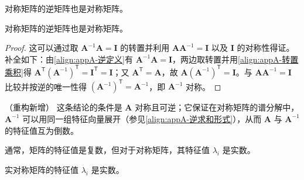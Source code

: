 \documentclass[../main.tex]{subfiles}
\begin{document}
对称矩阵的逆矩阵也是对称矩阵。

\begin{proposition}[对称矩阵的逆]\label{proposition:appA-对称矩阵的逆}
对称矩阵的逆矩阵也是对称矩阵。
\end{proposition}

\begin{proof}
这可以通过取 $\bm{A}^{-1}\bm{A}=\bm{I}$ 的转置并利用 $\bm{A}\bm{A}^{-1}=\bm{I}$ 以及 $\bm{I}$ 的对称性得证。补全如下：由\eqref{align:appA-逆定义}有 $\bm{A}^{-1}\bm{A}=\bm{I}$，两边取转置并用\eqref{align:appA-转置乘积}得 $\bm{A}^{\mathsf{T}}(\bm{A}^{-1})^{\mathsf{T}}=\bm{I}^{\mathsf{T}}=\bm{I}$；又 $\bm{A}^{\mathsf{T}}=\bm{A}$，故 $\bm{A}(\bm{A}^{-1})^{\mathsf{T}}=\bm{I}$。与 $\bm{A}\bm{A}^{-1}=\bm{I}$ 比较并按逆的唯一性得 $(\bm{A}^{-1})^{\mathsf{T}}=\bm{A}^{-1}$，即 $\bm{A}^{-1}$ 对称。
\end{proof}

\begin{remark}（重构新增）
这条结论的条件是 $\bm{A}$ 对称且可逆；它保证在对称矩阵的谱分解中，$\bm{A}^{-1}$ 可以用同一组特征向量展开（参见\eqref{align:appA-逆求和形式}），从而 $\bm{A}$ 与 $\bm{A}^{-1}$ 的特征值互为倒数。
\end{remark}

通常，矩阵的特征值是复数，但对于对称矩阵，其特征值 $\lambda_i$ 是实数。

\begin{proposition}[实对称矩阵的特征值为实数]\label{proposition:appA-实对称特征值为实}
实对称矩阵的特征值 $\lambda_i$ 是实数。
\end{proposition}
\end{document}
